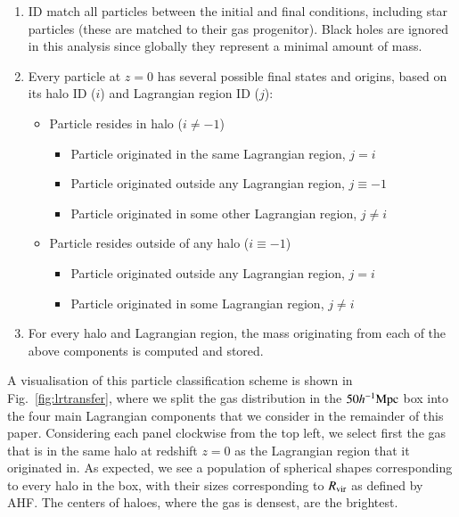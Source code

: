 \begin{enumerate}
	\item ID match all particles between the initial and final conditions, including
	      star particles (these are matched to their gas progenitor). Black holes are ignored in this analysis since globally they represent a minimal amount of mass.

	\item Every particle at $z=0$ has several possible final states and origins, based on its halo ID ($i$) and Lagrangian region ID ($j$):
	      \begin{itemize}
	            \item Particle resides in  halo ($i \neq -1$)
	            \begin{itemize}
	           		\item Particle originated in the same Lagrangian region, $j = i$
	           		\item Particle originated outside any Lagrangian region, $j \equiv -1$
	           		\item Particle originated in some other Lagrangian region, $j \neq i$
	            \end{itemize}
	            \item Particle resides outside of any halo ($i \equiv -1$)
	            \begin{itemize}
	            	\item Particle originated outside any Lagrangian region, $j = i$
	            	\item Particle originated in some Lagrangian region, $j \neq i$
	            \end{itemize}
	      \end{itemize}
	      
	\item For every halo and Lagrangian region, the mass originating from each
	      of the above components is computed and stored.
\end{enumerate}

A visualisation of this particle classification scheme is shown in
Fig.~\ref{fig:lrtransfer}, where we split the gas distribution in the
\simba{} $50h^{-1}{\rm Mpc}{}$ box into the four main Lagrangian components that we
consider in the remainder of this paper. Considering each panel clockwise
from the top left, we select first the gas that is in the same halo at
redshift $z=0$ as the Lagrangian region that it originated in. As expected,
we see a population of spherical shapes corresponding to every halo in the
box, with their sizes corresponding to $R_{\rm vir}$ as defined by AHF. The
centers of haloes, where the gas is densest, are the brightest.

